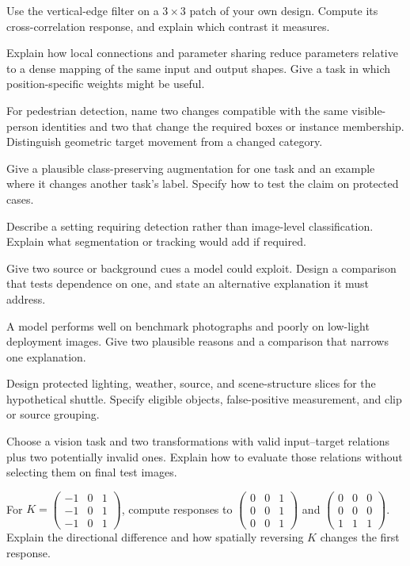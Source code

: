 \begin{exercises}
\item {}Use the vertical-edge filter on a $3\times3$ patch of your own design. Compute its cross-correlation response, and explain which contrast it measures.
\item {}Explain how local connections and parameter sharing reduce parameters relative to a dense mapping of the same input and output shapes. Give a task in which position-specific weights might be useful.
\item {}For pedestrian detection, name two changes compatible with the same visible-person identities and two that change the required boxes or instance membership. Distinguish geometric target movement from a changed category.
\item {}Give a plausible class-preserving augmentation for one task and an example where it changes another task's label. Specify how to test the claim on protected cases.
\item {}Describe a setting requiring detection rather than image-level classification. Explain what segmentation or tracking would add if required.
\item {}Give two source or background cues a model could exploit. Design a comparison that tests dependence on one, and state an alternative explanation it must address.
\item {}A model performs well on benchmark photographs and poorly on low-light deployment images. Give two plausible reasons and a comparison that narrows one explanation.
\item {}Design protected lighting, weather, source, and scene-structure slices for the hypothetical shuttle. Specify eligible objects, false-positive measurement, and clip or source grouping.
\item {}Choose a vision task and two transformations with valid input--target relations plus two potentially invalid ones. Explain how to evaluate those relations without selecting them on final test images.
\item {}For $K=\begin{pmatrix}-1&0&1\\-1&0&1\\-1&0&1\end{pmatrix}$, compute responses to $\begin{pmatrix}0&0&1\\0&0&1\\0&0&1\end{pmatrix}$ and $\begin{pmatrix}0&0&0\\0&0&0\\1&1&1\end{pmatrix}$. Explain the directional difference and how spatially reversing $K$ changes the first response.

\end{exercises}
